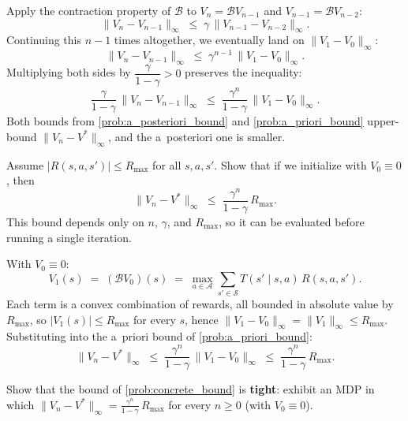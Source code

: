 \documentclass[11pt]{article}
\newcommand{\cS}{\mathcal{S}}
\newcommand{\cA}{\mathcal{A}}
\begin{document}
\begin{solution}
Apply the contraction property of $\mathcal{B}$ to $V_n = \mathcal{B} V_{n-1}$ and $V_{n-1} = \mathcal{B} V_{n-2}$:
$$
\|V_n - V_{n-1}\|_\infty \;\le\; \gamma\, \|V_{n-1} - V_{n-2}\|_\infty.
$$
Continuing this $n-1$ times altogether, we eventually land on $\|V_1 - V_0\|_\infty$:
$$
\|V_n - V_{n-1}\|_\infty \;\le\; \gamma^{n-1}\, \|V_1 - V_0\|_\infty.
$$
Multiplying both sides by $\dfrac{\gamma}{1-\gamma} > 0$ preserves the inequality:
$$
\frac{\gamma}{1-\gamma}\, \|V_n - V_{n-1}\|_\infty \;\le\; \frac{\gamma^n}{1-\gamma}\, \|V_1 - V_0\|_\infty.
$$
Both bounds from \cref{prob:a_posteriori_bound} and \cref{prob:a_priori_bound} upper-bound $\|V_n - V^*\|_\infty$, and the a~posteriori one is smaller.
\end{solution}

\begin{exercise}
\label{prob:concrete_bound} Assume $|R(s,a,s')| \le R_{\max}$ for all $s,a,s'$. Show that if we initialize with $V_0 \equiv 0$, then
$$
\|V_n - V^*\|_\infty \;\le\; \frac{\gamma^n}{1-\gamma}\, R_{\max}.
$$
This bound depends only on $n$, $\gamma$, and $R_{\max}$, so it can be evaluated before running a single iteration.
\end{exercise}

\begin{solution}
With $V_0 \equiv 0$:
$$
V_1(s) \;=\; (\mathcal{B} V_0)(s) \;=\; \max_{a \in \cA} \sum_{s' \in \cS} T(s' \mid s, a)\, R(s,a,s').
$$
Each term is a convex combination of rewards, all bounded in absolute value by $R_{\max}$, so $|V_1(s)| \le R_{\max}$ for every $s$, hence $\|V_1 - V_0\|_\infty = \|V_1\|_\infty \le R_{\max}$. Substituting into the a~priori bound of \cref{prob:a_priori_bound}:
$$
\|V_n - V^*\|_\infty \;\le\; \frac{\gamma^n}{1-\gamma}\, \|V_1 - V_0\|_\infty \;\le\; \frac{\gamma^n}{1-\gamma}\, R_{\max}.
$$
\end{solution}

\begin{exercise}
\label{prob:bound_tight} Show that the bound of \cref{prob:concrete_bound} is \textbf{tight}: exhibit an MDP in which $\|V_n - V^*\|_\infty = \frac{\gamma^n}{1-\gamma}\, R_{\max}$ for every $n \ge 0$ (with $V_0 \equiv 0$).
\end{exercise}
\end{document}
